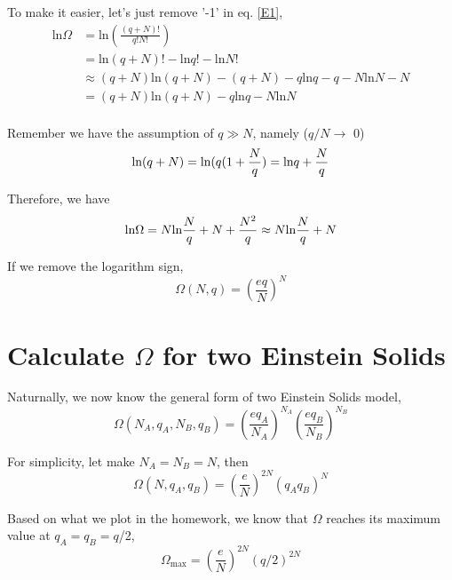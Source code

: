\documentclass[twoside]{article}
\begin{document}
To make it easier, let's just remove '-1' in eq. \ref{E1},
\begin{equation} \label{E1}
\begin{split}
 \text{ln}\Omega &= \text{ln}(\frac{(q+N)!}{q!N!})\\
         &= \text{ln}(q+N)! - \text{ln}q! - \text{ln}N!\\
   &\approx (q+N)\text{ln}(q+N) - (q+N) - q\text{ln}q - q - N\text{ln}N - N\\
        & = (q+N)\text{ln}(q+N) - q\text{ln}q - N\text{ln}N \\
\end{split}
\end{equation}

Remember we have the assumption of $q\gg N$, namely ($q/N \rightarrow$ 0)
\begin{equation} \label{E1}
       \text{ln}(q+N) = \text{ln}(q(1+\frac{N}{q})\\
                      = \text{ln}q + \frac{N}{q} 
\end{equation}

Therefore, we have 
\begin{equation} \label{E1}
       \text{ln}\Omega = N\text{ln}\frac{N}{q} + N + \frac{N^2}{q}\\
                 \approx N\text{ln}\frac{N}{q} + N 
\end{equation}

If we remove the logarithm sign,
\begin{equation} \label{E1}
       \Omega(N,q) = (\frac{eq}{N})^N
\end{equation}


\section{Calculate $\Omega$ for two Einstein Solids}
Naturnally, we now know the general form of two Einstein Solids model,
\begin{equation} \label{E1}
       \Omega(N_A,q_A,N_B,q_B) = (\frac{eq_A}{N_A})^{N_A} (\frac{eq_B}{N_B})^{N_B}
\end{equation}

For simplicity, let make $N_A = N_B = N $, then
\begin{equation} \label{E2}
       \Omega(N,q_A,q_B) = (\frac{e}{N})^{2N} (q_A q_B)^{N}
\end{equation}

Based on what we plot in the homework, we know that $\Omega$ reaches its maximum value at 
$q_A = q_B = q$/2,
\begin{equation}
       \Omega_\text{max} = (\frac{e}{N})^{2N} (q/2)^{2N}
\end{equation}
\end{document}
